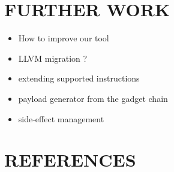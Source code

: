 \documentclass[10pt,twocolumn]{article}
\begin{document}
\section{FURTHER WORK}
\begin{itemize}
    \item How to improve our tool
    \item LLVM migration ?
    \item extending supported instructions
    \item payload generator from the gadget chain
    \item side-effect management
\end{itemize}


\section{REFERENCES}
\begingroup
\renewcommand{\section}[2]{}

\small
\endgroup

\appendix
\clearpage
\end{document}
